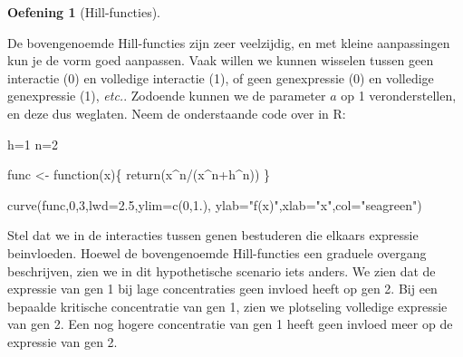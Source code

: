 \documentclass[
  a4paper,
]{scrbook}
\newenvironment{Shaded}{\begin{snugshade}}{\end{snugshade}}
\newcommand{\AttributeTok}[1]{\textcolor[rgb]{0.40,0.45,0.13}{#1}}
\newcommand{\ControlFlowTok}[1]{\textcolor[rgb]{0.00,0.23,0.31}{#1}}
\newcommand{\DecValTok}[1]{\textcolor[rgb]{0.68,0.00,0.00}{#1}}
\newcommand{\FloatTok}[1]{\textcolor[rgb]{0.68,0.00,0.00}{#1}}
\newcommand{\FunctionTok}[1]{\textcolor[rgb]{0.28,0.35,0.67}{#1}}
\newcommand{\NormalTok}[1]{\textcolor[rgb]{0.00,0.23,0.31}{#1}}
\newcommand{\OtherTok}[1]{\textcolor[rgb]{0.00,0.23,0.31}{#1}}
\newcommand{\SpecialCharTok}[1]{\textcolor[rgb]{0.37,0.37,0.37}{#1}}
\newcommand{\StringTok}[1]{\textcolor[rgb]{0.13,0.47,0.30}{#1}}
\theoremstyle{definition}
\newtheorem{exercise}{Oefening}[chapter]
\theoremstyle{remark}
\begin{document}
\begin{exercise}[Hill-functies]\protect\hypertarget{exr-hillfuncties}{}\label{exr-hillfuncties}

De bovengenoemde Hill-functies zijn zeer veelzijdig, en met kleine
aanpassingen kun je de vorm goed aanpassen. Vaak willen we kunnen
wisselen tussen geen interactie (0) en volledige interactie (1), of geen
genexpressie (0) en volledige genexpressie (1), \emph{etc.}. Zodoende
kunnen we de parameter \(a\) op 1 veronderstellen, en deze dus weglaten.
Neem de onderstaande code over in R:

\begin{Shaded}
\begin{Highlighting}[]
\NormalTok{h}\OtherTok{=}\DecValTok{1}
\NormalTok{n}\OtherTok{=}\DecValTok{2}

\NormalTok{func }\OtherTok{\textless{}{-}} \ControlFlowTok{function}\NormalTok{(x)\{}
  \FunctionTok{return}\NormalTok{(x}\SpecialCharTok{\^{}}\NormalTok{n}\SpecialCharTok{/}\NormalTok{(x}\SpecialCharTok{\^{}}\NormalTok{n}\SpecialCharTok{+}\NormalTok{h}\SpecialCharTok{\^{}}\NormalTok{n))}
\NormalTok{\}}

\FunctionTok{curve}\NormalTok{(func,}\DecValTok{0}\NormalTok{,}\DecValTok{3}\NormalTok{,}\AttributeTok{lwd=}\FloatTok{2.5}\NormalTok{,}\AttributeTok{ylim=}\FunctionTok{c}\NormalTok{(}\DecValTok{0}\NormalTok{,}\FloatTok{1.}\NormalTok{), }
      \AttributeTok{ylab=}\StringTok{"f(x)"}\NormalTok{,}\AttributeTok{xlab=}\StringTok{"x"}\NormalTok{,}\AttributeTok{col=}\StringTok{"seagreen"}\NormalTok{)}
\end{Highlighting}
\end{Shaded}

Stel dat we in de interacties tussen genen bestuderen die elkaars
expressie beinvloeden. Hoewel de bovengenoemde Hill-functies een
graduele overgang beschrijven, zien we in dit hypothetische scenario
iets anders. We zien dat de expressie van gen 1 bij lage concentraties
geen invloed heeft op gen 2. Bij een bepaalde kritische concentratie van
gen 1, zien we plotseling volledige expressie van gen 2. Een nog hogere
concentratie van gen 1 heeft geen invloed meer op de expressie van gen
2.


\end{exercise}
\end{document}
